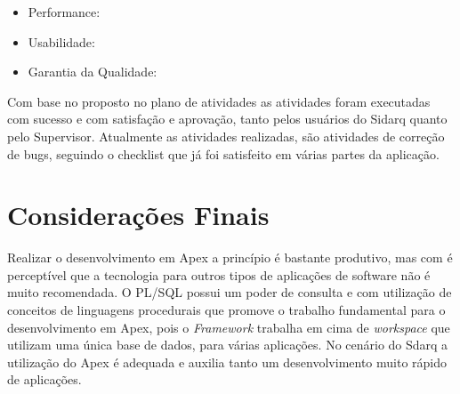 \begin{itemize}
    \item Performance:
    
    \item Usabilidade:


	\item Garantia da Qualidade:
\end{itemize}

Com base no proposto no plano de atividades as atividades foram executadas com sucesso e com satisfação e aprovação, tanto pelos usuários do Sidarq quanto pelo Supervisor. Atualmente as atividades realizadas, são atividades de correção de bugs, seguindo o checklist que já foi satisfeito em várias partes da aplicação.

\chapter[Considerações Finais]{Considerações Finais}

Realizar o desenvolvimento em Apex a princípio é bastante produtivo, mas com é perceptível que a tecnologia para outros tipos de aplicações de software não é muito recomendada. O PL/SQL possui um poder de consulta e com utilização de conceitos de linguagens procedurais que promove o trabalho fundamental para o desenvolvimento em Apex, pois o \textit{Framework} trabalha em cima de \textit{workspace} que utilizam uma única base de dados, para várias aplicações. No cenário do Sdarq a utilização do Apex é adequada e auxilia tanto um desenvolvimento muito rápido de aplicações. 

